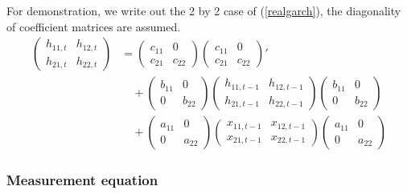 \documentclass[titlepage,11pt]{article}
\begin{document}
For demonstration, we write out the 2 by 2 case of  (\ref{realgarch}), the diagonality of coefficient matrices are assumed.
\begin{align*}
 \left(\begin{array}{cc}
h_{11,t} & h_{12,t} \\
h_{21,t} & h_{22,t} 
\end{array}\right) 
&= \left( \begin{array}{cc}
c_{11} & 0 \\
c_{21} & c_{22} 
\end{array} \right)\left( \begin{array}{cc}
c_{11} & 0 \\
c_{21} & c_{22} 
\end{array} \right)' 
\\ & \quad + \left( \begin{array}{cc}
b_{11} & 0 \\
0 & b_{22} 
\end{array} \right)\left(\begin{array}{cc}
h_{11,t-1} & h_{12,t-1} \\
h_{21,t-1} & h_{22,t-1} 
\end{array}\right)\left( \begin{array}{cc}
b_{11} & 0 \\
0 & b_{22} 
\end{array} \right)
\\ & \quad + \left( \begin{array}{cc}
a_{11} & 0 \\
0 & a_{22} 
\end{array} \right)\left(\begin{array}{cc}
x_{11,t-1} & x_{12,t-1} \\
x_{21,t-1} & x_{22,t-1} 
\end{array}\right)\left( \begin{array}{cc}
a_{11} & 0 \\
0 & a_{22} 
\end{array} \right)
\end{align*}


\subsubsection{Measurement equation}
\end{document}
